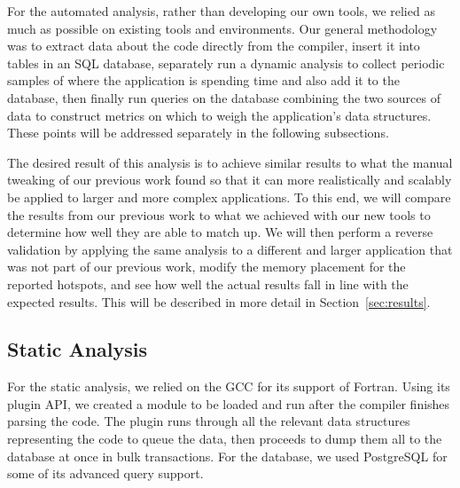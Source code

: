 For the automated analysis, rather than developing our own tools, we relied as much as possible on existing tools and environments.
Our general methodology was to extract data about the code directly from the compiler, insert it into tables in an \acs{SQL} database, separately run a dynamic analysis to collect periodic samples of where the application is spending time and also add it to the database, then finally run queries on the database combining the two sources of data to construct metrics on which to weigh the application's data structures.
These points will be addressed separately in the following subsections.

The desired result of this analysis is to achieve similar results to what the manual tweaking of our previous work found so that it can more realistically and scalably be applied to larger and more complex applications.
To this end, we will compare the results from our previous work to what we achieved with our new tools to determine how well they are able to match up.
We will then perform a reverse validation by applying the same analysis to a different and larger application that was not part of our previous work, modify the memory placement for the reported hotspots, and see how well the actual results fall in line with the expected results.
This will be described in more detail in Section~\ref{sec:results}.
\subsection{Static Analysis}
For the static analysis, we relied on the \ac{GCC} for its support of Fortran.
Using its plugin \acs{API}, we created a module to be loaded and run after the compiler finishes parsing the code.
The plugin runs through all the relevant data structures representing the code to queue the data, then proceeds to dump them all to the database at once in bulk transactions.
For the database, we used PostgreSQL for some of its advanced query support.
